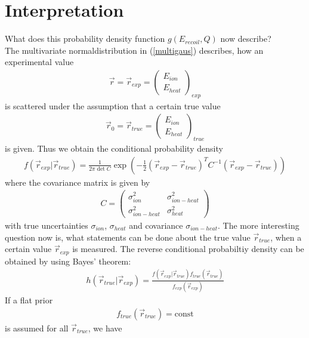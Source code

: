 \section{Interpretation}
What does this probability density function $g(E_{recoil},Q)$ now describe? \\
The multivariate normaldistribution in (\ref{multigaus}) describes, how an experimental value
\begin{gather}
\vec{r} = \vec{r}_{exp} = \begin{pmatrix} E_{ion} \\ E_{heat} \end{pmatrix}_{exp}
\end{gather}
is scattered under the assumption that a certain true value
\begin{gather}
\vec{r}_0 = \vec{r}_{true} = \begin{pmatrix} E_{ion} \\ E_{heat} \end{pmatrix}_{true}
\end{gather}
is given.
Thus we obtain the conditional probability density
\begin{gather}
f(\vec{r}_{exp} | \vec{r}_{true}) = \frac{1}{2 \pi \det C} \exp \left( - \frac{1}{2} (\vec{r}_{exp} - \vec{r}_{true})^{T} C^{-1} (\vec{r}_{exp} - \vec{r}_{true}) \right) \label{condexptrue}
\end{gather}
where the covariance matrix is given by 
\begin{gather}
C = \begin{pmatrix} \sigma_{ion}^2 & \sigma_{ion-heat}^2 \\ \sigma_{ion-heat}^2 & \sigma_{heat}^2 \end{pmatrix}
\end{gather}
with true uncertainties $\sigma_{ion}$, $\sigma_{heat}$ and covariance $\sigma_{ion-heat}$.
The more interesting question now is, what statements can be done about the true value $\vec{r}_{true}$, when a certain value $\vec{r}_{exp}$ is measured.
The reverse conditional probabiltiy density can be obtained by using Bayes' theorem:
\begin{gather}
h(\vec{r}_{true} | \vec{r}_{exp}) = \frac{f(\vec{r}_{exp} | \vec{r}_{true}) f_{true} (\vec{r}_{true})}{f_{exp} (\vec{r}_{exp})}
\end{gather}
If a flat prior
\begin{gather}
f_{true}(\vec{r}_{true}) = \mbox{const}
\end{gather}
is assumed for all $\vec{r}_{true}$,
we have 
